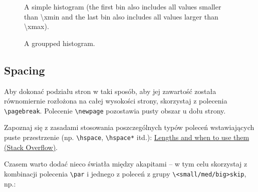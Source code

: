 \documentclass[pdftex,11pt,a4paper]{article}
\begin{document}
\begin{figure}[H]
	\setlength{\imgwidth}{10cm}
	\setlength{\imgheight}{3cm}
	
	

	\centering
	
	\caption{\label{fig:histogram_simple}A simple histogram (the first bin also includes all values smaller than \num[round-mode=places,round-precision=2]{\xmin} and the last bin also includes all values larger than \num[round-mode=places,round-precision=2]{\xmax}).}
\end{figure}


\begin{figure}[H]
	\setlength{\imgwidth}{15cm}
	\setlength{\imgheight}{6cm}

	

	\centering
	
	\caption{\label{fig:histogram_groupped}A groupped histogram.}
\end{figure} 

\subsection{Spacing}


Aby dokonać podziału stron w taki sposób, aby jej zawartość została równomiernie rozłożona na całej wysokości strony, skorzystaj z polecenia \lstinline|\pagebreak|. Polecenie \lstinline|\newpage| pozostawia pusty obszar u dołu strony.

\par\bigskip


Zapoznaj się z zasadami stosowania poszczególnych typów poleceń wstawiających puste przestrzenie (np. \lstinline|\hspace|, \lstinline|\hspace*| itd.): \href{https://tex.stackexchange.com/a/41488/44391}{Lengths and when to use them (Stack Overflow)}.

\par\bigskip


Czasem warto dodać nieco światła między akapitami -- w tym celu skorzystaj z kombinacji polecenia \lstinline|\par| i jednego z poleceń z grupy \lstinline|\<small/med/big>skip|, np.:
\end{document}
